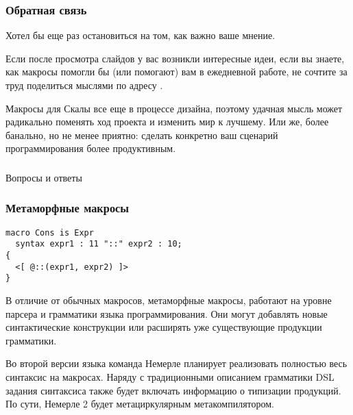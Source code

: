 \documentclass[hyperref={bookmarks=false}]{beamer}
\begin{document}
\begin{frame}[t]
\frametitle{Обратная связь}

Хотел бы еще раз остановиться на том, как важно ваше мнение.

Если после просмотра слайдов у вас возникли интересные идеи, если вы знаете, как макросы помогли бы (или помогают) вам в ежедневной работе, не сочтите за труд поделиться мыслями по адресу .

Макросы для Скалы все еще в процессе дизайна, поэтому удачная мысль может радикально поменять ход проекта и изменить мир к лучшему. Или же, более банально, но не менее приятно: сделать конкретно ваш сценарий программирования более продуктивным.
\end{frame}

\begin{frame}[c, fragile]
\frametitle{}

\centering
{\Large Вопросы и ответы}\\

\centering
{}

\end{frame}

\begin{frame}[t, fragile]
\frametitle{Метаморфные макросы}

\begin{lstlisting}[language=nemerle]
macro Cons is Expr 
  syntax expr1 : 11 "::" expr2 : 10; 
{ 
  <[ @::(expr1, expr2) ]> 
}
\end{lstlisting}

В отличие от обычных макросов, метаморфные макросы, работают на уровне парсера и грамматики языка программирования. Они могут добавлять новые синтактические конструкции или расширять уже существующие продукции грамматики.

Во второй версии языка команда Немерле планирует реализовать полностью весь синтаксис на макросах. Наряду с традиционными описанием грамматики DSL задания синтаксиса также будет включать информацию о типизации продукций. По сути, Немерле 2 будет метациркулярным метакомпилятором.

\end{frame}
\end{document}
